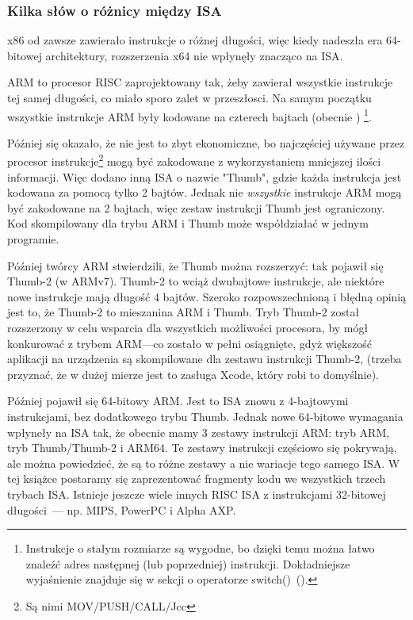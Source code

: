 \subsubsection{Kilka słów o różnicy między \ac{ISA}}
x86 od zawsze zawierało instrukcje o różnej długości, więc kiedy nadeszła era 64-bitowej architektury, rozszerzenia x64 nie wpłynęły znacząco na \ac{ISA}.

ARM to procesor \ac{RISC} zaprojektowany tak, żeby zawierał wszystkie instrukcje tej samej długości, co miało sporo zalet w przeszłosci.
Na samym początku wszystkie instrukcje ARM były kodowane na czterech bajtach (obecnie )%
\footnote{
Instrukcje o stałym rozmiarze są wygodne, bo dzięki temu można łatwo znaleźć adres następnej (lub poprzedniej) instrukcji. Dokładniejsze wyjaśnienie znajduje się w sekcji o operatorze switch()~().
}.

Później się okazało, że nie jest to zbyt ekonomiczne, bo najczęściej używane przez procesor instrukcje\footnote{Są nimi MOV/PUSH/CALL/Jcc} mogą być zakodowane z wykorzystaniem mniejszej ilości informacji.
Więc dodano inną \ac{ISA} o nazwie "Thumb", gdzie każda instrukcja jest kodowana za pomocą tylko 2 bajtów.
Jednak nie \emph{wszystkie} instrukcje ARM mogą być zakodowane na 2 bajtach, więc zestaw instrukcji Thumb jest ograniczony.
Kod skompilowany dla trybu ARM i Thumb może współdziałać w jednym programie.

Później twórcy ARM stwierdzili, że Thumb można rozszerzyć: tak pojawił się Thumb-2 (w ARMv7).
Thumb-2 to wciąż dwubajtowe instrukcje, ale niektóre nowe instrukcje mają długość 4 bajtów.
Szeroko rozpowszechnioną i błędną opinią jest to, że Thumb-2 to mieszanina ARM i Thumb.
Tryb Thumb-2 został rozszerzony w celu wsparcia dla wszystkich możliwości procesora, by mógł
konkurować z trybem ARM---co zostało w pełni osiągnięte, gdyż większość aplikacji na urządzenia \idevices są skompilowane dla
zestawu instrukcji Thumb-2, (trzeba przyznać, że w dużej mierze jest to zasługa Xcode, który robi to domyślnie).

Później pojawił się 64-bitowy ARM. Jest to \ac{ISA} znowu z 4-bajtowymi instrukcjami, bez dodatkowego trybu Thumb.
Jednak nowe 64-bitowe wymagania wpłyneły na \ac{ISA} tak, że obecnie mamy 3 zestawy instrukcji ARM: tryb ARM, tryb Thumb/Thumb-2 i ARM64.
Te zestawy instrukcji częściowo się pokrywają, ale można powiedzieć, że są to różne zestawy a nie wariacje tego samego \ac{ISA}.
W tej książce postaramy się zaprezentować fragmenty kodu we wszystkich trzech trybach \ac{ISA}.
%
%
%
Istnieje jeszcze wiele innych \ac{RISC} \ac{ISA} z instrukcjami 32-bitowej długości~--- np. MIPS, PowerPC i Alpha AXP.

